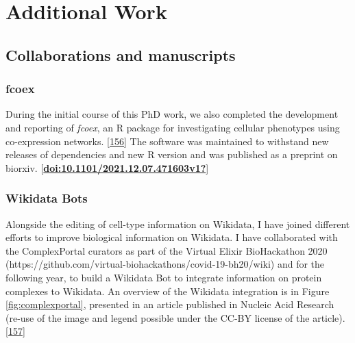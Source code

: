 \hypertarget{additional-work}{%
\section{Additional Work}\label{additional-work}}

\hypertarget{collaborations-and-manuscripts}{%
\subsection{Collaborations and manuscripts}\label{collaborations-and-manuscripts}}

\hypertarget{fcoex}{%
\subsubsection{fcoex}\label{fcoex}}

During the initial course of this PhD work, we also completed the development and reporting of \emph{fcoex}, an R package for investigating cellular phenotypes using co-expression networks. {[}\protect\hyperlink{ref-MxIeSJYt}{156}{]} The software was maintained to withstand new releases of dependencies and new R version and was published as a preprint on biorxiv. {[}\protect\hyperlink{ref-doi:10.1101ux2f2021.12.07.471603v1}{\textbf{doi:10.1101/2021.12.07.471603v1?}}{]}

\hypertarget{wikidata-bots}{%
\subsubsection{Wikidata Bots}\label{wikidata-bots}}

Alongside the editing of cell-type information on Wikidata, I have joined different efforts to improve biological information on Wikidata.
I have collaborated with the ComplexPortal curators as part of the Virtual Elixir BioHackathon 2020 (https://github.com/virtual-biohackathons/covid-19-bh20/wiki) and for the following year, to build a Wikidata Bot to integrate information on protein complexes to Wikidata. An overview of the Wikidata integration is in Figure \ref{fig:complexportal}, presented in an article published in Nucleic Acid Research (re-use of the image and legend possible under the CC-BY license of the article). {[}\protect\hyperlink{ref-CQRJ53gu}{157}{]}

